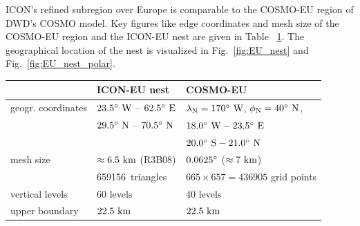 ICON's refined subregion over Europe is comparable to the COSMO-EU region 
of DWD's COSMO model. Key figures like edge coordinates and mesh size of the COSMO-EU region and the ICON-EU nest 
are given in Table ~\ref{tab:COSMO_ICON_nest_extent}. The geographical location of the nest is visualized in 
Fig.~\ref{fig:EU_nest} and Fig.~\ref{fig:EU_nest_polar}.

\begin{table}
\centering
{}\label{tab:COSMO_ICON_nest_extent}

\begin{tabular}{|p{5cm}|l|l|}\hline
\rowcolor{Gray}
                           &    {\centering\textbf{ICON-EU nest}}                 &     {\centering\textbf{COSMO-EU}} \\ \hline\hline
geogr. coordinates         &    $23.5^{\circ}~\text{W}$ -- $62.5^{\circ}~\text{E}$    &     $\lambda_{\text{N}} = 170^{\circ}~\text{W}$, 
                                                                                          $\phi_{\text{N}}    =  40^{\circ}~\text{N}$,     \\
                           &    $29.5^{\circ}~\text{N}$ -- $70.5^{\circ}~\text{N}$   &      $18.0^{\circ}~\text{W} - 23.5^{\circ}~\text{E}$ \\
                           &                                                      &     $20.0^{\circ}~\text{S} - 21.0^{\circ}~\text{N}$  \\[0.5em]
mesh size                  &    $\approx 6.5~\text{km}$ (R3B08)                         &     $0.0625^{\circ}$ ($\approx 7~\text{km}$) \\
                           &    659156~triangles                                  &     $665 \times 657 = 436905$ grid points \\
vertical levels            &    60 levels                                         &     40 levels      \\
upper boundary             &    $22.5~\text{km}$                                        &     $22.5~\text{km}$ \\ \hline

\end{tabular}
\end{table}



